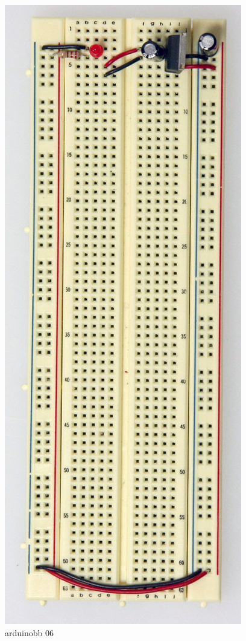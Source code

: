 \begin{figure}[!htb]
 \centering
 \includegraphics[scale=0.3]{img/arduino_breadboard/arduinobb_06.jpg}
 \caption{arduinobb 06}
 \label{arduinobb 06}
\end{figure}


